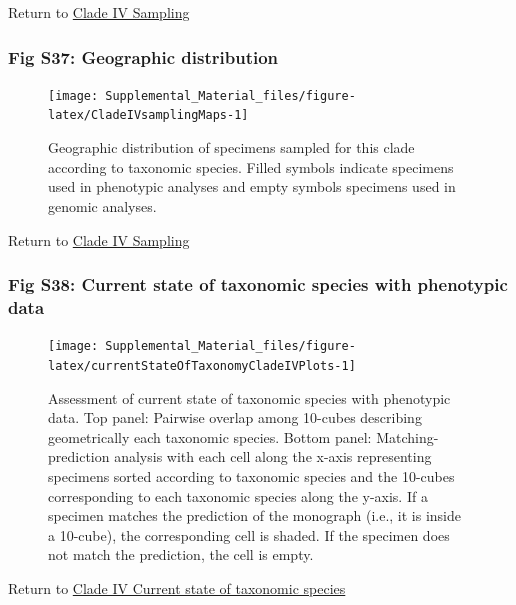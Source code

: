 \documentclass[
  11pt,
]{article}
\begin{document}
Return to \protect\hyperlink{sampling-4}{Clade IV Sampling}
\pagebreak

\hypertarget{fig-s37-geographic-distribution}{%
\subsubsection{Fig S37: Geographic distribution}\label{fig-s37-geographic-distribution}}

\begin{figure}

{\centering \texttt{[image: Supplemental\_Material\_files/figure-latex/CladeIVsamplingMaps-1]} 

}

\caption{Geographic distribution of specimens sampled for this clade according to taxonomic species. Filled symbols indicate specimens used in phenotypic analyses and empty symbols specimens used in genomic analyses.}\label{fig:CladeIVsamplingMaps}
\end{figure}

Return to \protect\hyperlink{sampling-4}{Clade IV Sampling}
\pagebreak

\hypertarget{fig-s38-current-state-of-taxonomic-species-with-phenotypic-data}{%
\subsubsection{Fig S38: Current state of taxonomic species with phenotypic data}\label{fig-s38-current-state-of-taxonomic-species-with-phenotypic-data}}

\begin{figure}
\texttt{[image: Supplemental\_Material\_files/figure-latex/currentStateOfTaxonomyCladeIVPlots-1]} \caption{Assessment of current state of taxonomic species with phenotypic data. Top panel: Pairwise overlap among 10-cubes describing geometrically each taxonomic species. Bottom panel: Matching-prediction analysis with each cell along the x-axis representing specimens sorted according to taxonomic species and the 10-cubes corresponding to each taxonomic species along the y-axis. If a specimen matches the prediction of the monograph (i.e., it is inside a 10-cube), the corresponding cell is shaded. If the specimen does not match the prediction, the cell is empty.}\label{fig:currentStateOfTaxonomyCladeIVPlots}
\end{figure}

Return to \protect\hyperlink{current-state-of-taxonomic-species-3}{Clade IV Current state of taxonomic species}
\pagebreak
\end{document}
